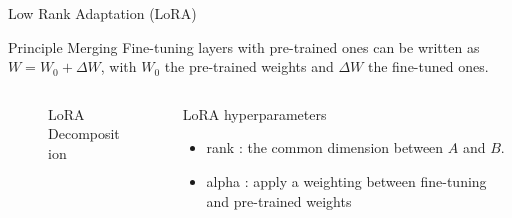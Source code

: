 \begin{frame}{Low Rank Adaptation (LoRA)}
    \begin{block}{Principle}
        Merging Fine-tuning layers with pre-trained ones can be written as $W = W_0 + \Delta W$, with $W_0$ the pre-trained weights and $\Delta W$ the fine-tuned ones.         
    \end{block}

    \begin{columns}
        \begin{column}[t]{0.45\textwidth}
        \begin{figure}
            \centering
            
            \caption{LoRA Decomposition}
        \end{figure}
            
        \end{column}
        
        \begin{column}[t]{0.3\textwidth}
            \begin{block}{LoRA hyperparameters}
            \begin{itemize}
                \item rank : the common dimension between $A$ and $B$.
                \item alpha : apply a weighting between fine-tuning and pre-trained weights
            \end{itemize}
                
            \end{block}
            
        \end{column}
    \end{columns}
    
\end{frame}

